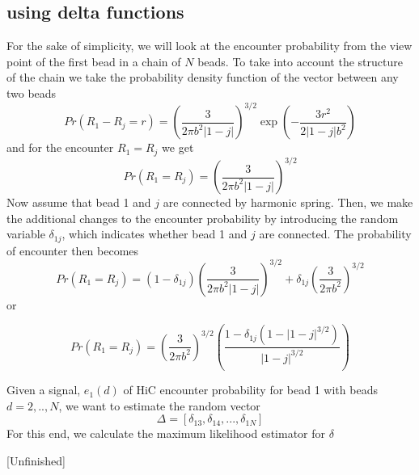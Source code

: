 \documentclass[12pt]{article}
\begin{document}
\subsection{using delta functions}
For the sake of simplicity, we will look at the encounter probability from the view point of the first bead in a chain of $N$ beads.
To take into account the structure of the chain we take the probability density function of the vector between any two beads 
\begin{equation*}
Pr(R_1-R_j =r)=\left(\frac{3}{2\pi b^2 |1-j|}\right)^{3/2}\exp\left(-\frac{3r^2}{2|1-j|b^2}\right)
\end{equation*} 
and for the encounter $R_1=R_j$ we get 
\begin{equation*}
Pr(R_1=R_j)=\left(\frac{3}{2\pi b^2 |1-j|}\right)^{3/2}
\end{equation*}
Now assume that bead 1 and $j$ are connected by harmonic spring. Then, we make the additional changes to the encounter probability by introducing the random variable $\delta_{1j}$, which indicates whether bead 1 and $j$ are connected. 
The probability of encounter then becomes 
\begin{equation*}
Pr(R_1=R_j)=(1-\delta_{1j})\left(\frac{3}{2\pi b^2 |1-j|}\right)^{3/2}+\delta_{1j}\left(\frac{3}{2\pi b^2}\right)^{3/2}
\end{equation*}
or 

\begin{equation*}
Pr(R_1=R_j)=\left(\frac{3}{2\pi b^2}\right)^{3/2}\left(\frac{1-\delta_{1j}\left(1-|1-j|^{3/2}\right)}{|1-j|^{3/2}}\right)
\end{equation*}

Given a signal, $e_1(d)$ of HiC encounter probability for bead 1 with beads $d=2,..,N$, we want to estimate the random vector 
\begin{equation*}
\Delta = [\delta_{13},\delta_{14},...,\delta_{1N} ]
\end{equation*}
For this end, we calculate the maximum likelihood estimator for $\delta$

[Unfinished]
\end{document}
